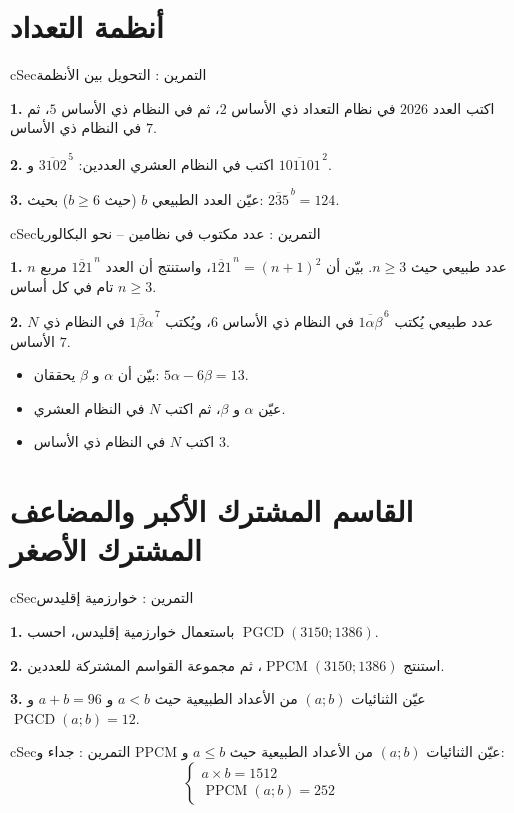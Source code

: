 \documentclass[12pt,a4paper]{article}
\newenvironment{BOX}[2]{\begin{otherlanguage}{english}\begin{arbox}{#1}{#2}}{\end{arbox}\end{otherlanguage}}
\newcounter{exo}
\newenvironment{tamrin}[1]{\stepcounter{exo}\begin{BOX}{cSec}{التمرين \theexo: #1}}{\end{BOX}}
\newcommand{\pgcd}{\operatorname{PGCD}}
\newcommand{\ppcm}{\operatorname{PPCM}}
\newenvironment{sq}{\begin{itemize}[leftmargin=2.4em,itemsep=3pt]}{\end{itemize}}
\newcommand{\qa}{\item[(أ)]}\newcommand{\qb}{\item[(ب)]}\newcommand{\qc}{\item[(جـ)]}\newcommand{\qd}{\item[(د)]}\newcommand{\qe}{\item[(هـ)]}
\newcommand{\QQ}[1]{\par\smallskip\textbf{#1.} }
\begin{document}
\section{أنظمة التعداد}

\begin{tamrin}{التحويل بين الأنظمة}
\QQ{1} اكتب العدد $2026$ في نظام التعداد ذي الأساس $2$، ثم في النظام ذي الأساس $5$، ثم في النظام ذي الأساس $7$.
\QQ{2} اكتب في النظام العشري العددين: $\overline{3102}^{\,5}$ و $\overline{101101}^{\,2}$.
\QQ{3} عيّن العدد الطبيعي $b$ (حيث $b\ge 6$) بحيث: $\overline{235}^{\,b}=124$.
\end{tamrin}

\begin{tamrin}{عدد مكتوب في نظامين -- نحو البكالوريا}
\QQ{1} $n$ عدد طبيعي حيث $n\ge 3$. بيّن أن $\overline{121}^{\,n}=(n+1)^2$، واستنتج أن العدد $\overline{121}^{\,n}$ مربع تام في كل أساس $n\ge 3$.
\QQ{2} $N$ عدد طبيعي يُكتب $\overline{1\alpha\beta}^{\,6}$ في النظام ذي الأساس $6$، ويُكتب $\overline{1\beta\alpha}^{\,7}$ في النظام ذي الأساس $7$.
\begin{sq}
\qa بيّن أن $\alpha$ و $\beta$ يحققان: $5\alpha-6\beta=13$.
\qb عيّن $\alpha$ و $\beta$، ثم اكتب $N$ في النظام العشري.
\qc اكتب $N$ في النظام ذي الأساس $3$.
\end{sq}
\end{tamrin}

\section{القاسم المشترك الأكبر والمضاعف المشترك الأصغر}

\begin{tamrin}{خوارزمية إقليدس}
\QQ{1} باستعمال خوارزمية إقليدس، احسب $\pgcd(3150;1386)$.
\QQ{2} استنتج $\ppcm(3150;1386)$، ثم مجموعة القواسم المشتركة للعددين.
\QQ{3} عيّن الثنائيات $(a;b)$ من الأعداد الطبيعية حيث $a<b$ و $a+b=96$ و $\pgcd(a;b)=12$.
\end{tamrin}

\begin{tamrin}{جداء و PPCM}
عيّن الثنائيات $(a;b)$ من الأعداد الطبيعية حيث $a\le b$ و:
\[\begin{cases} a\times b=1512\\ \ppcm(a;b)=252\end{cases}\]
\end{tamrin}
\end{document}
